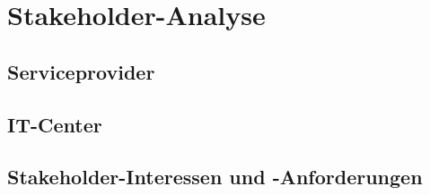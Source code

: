 \section{Stakeholder-Analyse}\label{sec:stakeholder}
   \subsection{Serviceprovider}\label{subsec:serviceprovider}
   \subsection{IT-Center}\label{subsec:itcenter}
   \subsection{Stakeholder-Interessen und -Anforderungen}\label{subsec:stakeholder-anforderungen}